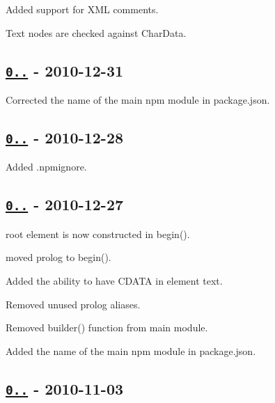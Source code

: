 \begin{DoxyItemize}
\item Added support for X\+ML comments.
\item Text nodes are checked against Char\+Data.
\end{DoxyItemize}

\subsection*{\href{https://github.com/oozcitak/xmlbuilder-js/compare/v0.0.4...v0.0.5}{\tt 0..} -\/ 2010-\/12-\/31}


\begin{DoxyItemize}
\item Corrected the name of the main npm module in {\ttfamily package.\+json}.
\end{DoxyItemize}

\subsection*{\href{https://github.com/oozcitak/xmlbuilder-js/compare/v0.0.3...v0.0.4}{\tt 0..} -\/ 2010-\/12-\/28}


\begin{DoxyItemize}
\item Added {\ttfamily .npmignore}.
\end{DoxyItemize}

\subsection*{\href{https://github.com/oozcitak/xmlbuilder-js/compare/v0.0.2...v0.0.3}{\tt 0..} -\/ 2010-\/12-\/27}


\begin{DoxyItemize}
\item root element is now constructed in {\ttfamily begin()}.
\item moved prolog to {\ttfamily begin()}.
\item Added the ability to have C\+D\+A\+TA in element text.
\item Removed unused prolog aliases.
\item Removed {\ttfamily builder()} function from main module.
\item Added the name of the main npm module in {\ttfamily package.\+json}.
\end{DoxyItemize}

\subsection*{\href{https://github.com/oozcitak/xmlbuilder-js/compare/v0.0.1...v0.0.2}{\tt 0..} -\/ 2010-\/11-\/03}


